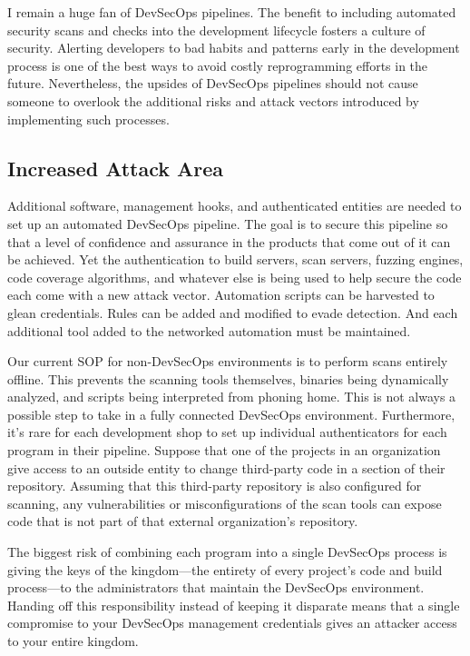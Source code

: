 I remain a huge fan of DevSecOps pipelines. The benefit to including automated security scans and checks into the development lifecycle fosters a culture of security. Alerting developers to bad habits and patterns early in the development process is one of the best ways to avoid costly reprogramming efforts in the future. Nevertheless, the upsides of DevSecOps pipelines should not cause someone to overlook the additional risks and attack vectors introduced by implementing such processes.

\subsection{Increased Attack Area}
Additional software, management hooks, and authenticated entities are needed to set up an automated DevSecOps pipeline. The goal is to secure this pipeline so that a level of confidence and assurance in the products that come out of it can be achieved. Yet the authentication to build servers, scan servers, fuzzing engines, code coverage algorithms, and whatever else is being used to help secure the code each come with a new attack vector. Automation scripts can be harvested to glean credentials. Rules can be added and modified to evade detection. And each additional tool added to the networked automation must be maintained.

Our current SOP for non-DevSecOps environments is to perform scans entirely offline. This prevents the scanning tools themselves, binaries being dynamically analyzed, and scripts being interpreted from phoning home. This is not always a possible step to take in a fully connected DevSecOps environment. Furthermore, it's rare for each development shop to set up individual authenticators for each program in their pipeline. Suppose that one of the projects in an organization give access to an outside entity to change third-party code in a section of their repository. Assuming that this third-party repository is also configured for scanning, any vulnerabilities or misconfigurations of the scan tools can expose code that is not part of that external organization's repository.

The biggest risk of combining each program into a single DevSecOps process is giving the keys of the kingdom---the entirety of every project's code and build process---to the administrators that maintain the DevSecOps environment. Handing off this responsibility instead of keeping it disparate means that a single compromise to your DevSecOps management credentials gives an attacker access to your entire kingdom.

